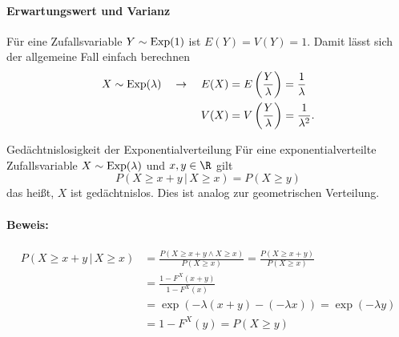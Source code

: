 \paragraph{Erwartungswert und Varianz}
Für eine Zufallsvariable $Y\sim\operatorname{Exp}(1)$ ist $E(Y)=V(Y)=1$. Damit lässt sich der allgemeine Fall einfach berechnen
\begin{align*}
	X\sim\operatorname{Exp}(\lambda)\quad\rightarrow\quad E(X)&=E\left(\frac Y\lambda\right)= \frac1\lambda\\
	V(X)&=V\left(\frac Y\lambda\right)=\frac{1}{\lambda^2}.
\end{align*}
\begin{satz}{Gedächtnislosigkeit der Exponentialverteilung}
	Für eine exponentialverteilte Zufallsvariable $X\sim \operatorname{Exp}(\lambda)$ und $x,y\in\R$ gilt
	\begin{equation*}
		P(X\geq x+y\,|\,X\geq x)=P(X\geq y)
	\end{equation*}
	das heißt, $X$ ist gedächtnislos. Dies ist analog zur geometrischen Verteilung.
\end{satz}
\paragraph{Beweis:}
\begin{align*}
	P(X\geq x+y\,|\,X\geq x)&=\frac{P(X\geq x+y\wedge X\geq x)}{P(X\geq x)}=\frac{P(X\geq x+y)}{P(X\geq x)}\\
	&=\frac{1-F^X(x+y)}{1-F^X(x)}\\
	&=\exp(-\lambda(x+y)-(-\lambda x))=\exp(-\lambda y)\\
	&=1-F^X(y)=P(X\geq y)
\end{align*}
